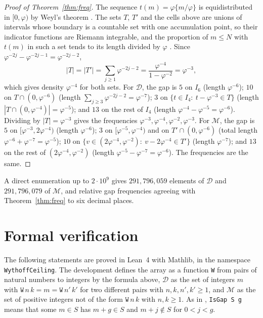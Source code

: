 \documentclass[12pt]{article}
\newcommand{\D}{\mathcal{D}}
\newcommand{\M}{\mathcal{M}}
\theoremstyle{plain}
\theoremstyle{remark}
\begin{document}
\begin{proof}[Proof of Theorem~\ref{thm:freq}]
The sequence $t(m)=\varphi\{m/\varphi\}$ is equidistributed in $[0,\varphi)$ by Weyl's theorem
\cite{weyl}. The sets $T$, $T'$ and the cells above are unions of intervals whose boundary is a
countable set with one accumulation point, so their indicator functions are Riemann integrable,
and the proportion of $m\le N$ with $t(m)$ in such a set tends to its length divided by $\varphi$
\cite{kn}. Since $\varphi^{-2j}-\varphi^{-2j-1}=\varphi^{-2j-2}$,
\[
|T|=|T'|=\sum_{j\ge1}\varphi^{-2j-2}=\frac{\varphi^{-4}}{1-\varphi^{-2}}=\varphi^{-3},
\]
which gives density $\varphi^{-4}$ for both sets. For $\D$, the gap is $5$ on $I_6$ (length
$\varphi^{-6}$); $10$ on $T\cap(0,\varphi^{-6})$ (length $\sum_{j\ge3}\varphi^{-2j-2}=\varphi^{-7}$);
$3$ on $\{t\in I_4:\ t-\varphi^{-3}\in T\}$ (length $|T\cap(0,\varphi^{-4})|=\varphi^{-5}$); and
$13$ on the rest of $I_4$ (length $\varphi^{-4}-\varphi^{-5}=\varphi^{-6}$). Dividing by
$|T|=\varphi^{-3}$ gives the frequencies $\varphi^{-3},\varphi^{-4},\varphi^{-2},\varphi^{-3}$.
For $\M$, the gap is $5$ on $[\varphi^{-3},2\varphi^{-4})$ (length $\varphi^{-6}$); $3$ on
$[\varphi^{-5},\varphi^{-4})$ and on $T'\cap(0,\varphi^{-6})$ (total length
$\varphi^{-6}+\varphi^{-7}=\varphi^{-5}$); $10$ on $\{v\in(2\varphi^{-4},\varphi^{-2}):\ v-2\varphi^{-4}\in T'\}$
(length $\varphi^{-7}$); and $13$ on the rest of $(2\varphi^{-4},\varphi^{-2})$ (length
$\varphi^{-5}-\varphi^{-7}=\varphi^{-6}$). The frequencies are the same.
\end{proof}

A direct enumeration up to $2\cdot10^9$ gives $291{,}796{,}059$ elements of $\D$ and
$291{,}796{,}079$ of $\M$, and relative gap frequencies agreeing with Theorem~\ref{thm:freq} to
six decimal places.

\section{Formal verification}\label{sec:lean}

\begin{sloppypar}
The following statements are proved in Lean~4 with Mathlib, in the namespace
\texttt{WythoffCeiling}. The development defines the array as a function \texttt{W} from pairs of
natural numbers to integers by the formula above, $\D$ as the set of integers
$m$ with $\texttt{W}\,n\,k=m=\texttt{W}\,n'\,k'$ for two different pairs with
$n,k,n',k'\ge1$, and $\M$ as the set of positive integers not of the form $\texttt{W}\,n\,k$
with $n,k\ge1$. As in \cite{link}, \texttt{IsGap S g} means that some $m\in S$ has $m+g\in S$ and
$m+j\notin S$ for $0<j<g$.
\end{sloppypar}
\end{document}
